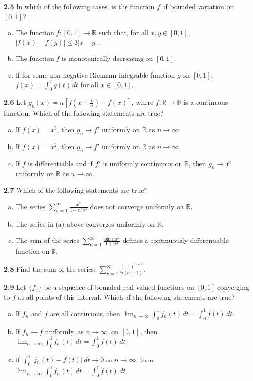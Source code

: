 \documentclass[11pt,a4paper]{article}
\newcommand{\R}{\mathbb{R}}
\newcommand{\qitem}[1]{\par\medskip\noindent\textbf{#1}\hspace{0.5em}}
\begin{document}
\qitem{2.5} In which of the following cases, is the function $f$ of bounded variation on $[0, 1]$?
\begin{enumerate}[a.]
  \item The function $f : [0, 1] \to \R$ such that, for all $x, y \in [0, 1]$, $|f(x) - f(y)| \le 3|x - y|$.
  \item The function $f$ is monotonically decreasing on $[0, 1]$.
  \item If for some non-negative Riemann integrable function $g$ on $[0, 1]$, $f(x) = \int_0^x g(t)\,dt$ for all $x \in [0, 1]$.
\end{enumerate}

\qitem{2.6} Let $g_n(x) = n\left[f\left(x + \frac{1}{n}\right) - f(x)\right]$, where $f : \R \to \R$ is a continuous function. Which of the following statements are true?
\begin{enumerate}[a.]
  \item If $f(x) = x^3$, then $g_n \to f'$ uniformly on $\R$ as $n \to \infty$.
  \item If $f(x) = x^2$, then $g_n \to f'$ uniformly on $\R$ as $n \to \infty$.
  \item If $f$ is differentiable and if $f'$ is uniformly continuous on $\R$, then $g_n \to f'$ uniformly on $\R$ as $n \to \infty$.
\end{enumerate}

\qitem{2.7} Which of the following statements are true?
\begin{enumerate}[a.]
  \item The series $\displaystyle\sum_{n=1}^{\infty} \frac{x^2}{1 + n^2 x^2}$ does not converge uniformly on $\R$.
  \item The series in (a) above converges uniformly on $\R$.
  \item The sum of the series $\displaystyle\sum_{n=1}^{\infty} \frac{\sin nx^2}{1 + n^3}$ defines a continuously differentiable function on $\R$.
\end{enumerate}

\qitem{2.8} Find the sum of the series: $\displaystyle\sum_{n=1}^{\infty} \frac{(-1)^{n+1}}{n(n+1)}$.

\qitem{2.9} Let $\{f_n\}$ be a sequence of bounded real valued functions on $[0, 1]$ converging to $f$ at all points of this interval. Which of the following statements are true?
\begin{enumerate}[a.]
  \item If $f_n$ and $f$ are all continuous, then $\lim_{n \to \infty} \int_0^1 f_n(t)\,dt = \int_0^1 f(t)\,dt$.
  \item If $f_n \to f$ uniformly, as $n \to \infty$, on $[0, 1]$, then $\lim_{n \to \infty} \int_0^1 f_n(t)\,dt = \int_0^1 f(t)\,dt$.
  \item If $\int_0^1 |f_n(t) - f(t)|\,dt \to 0$ as $n \to \infty$, then $\lim_{n \to \infty} \int_0^1 f_n(t)\,dt = \int_0^1 f(t)\,dt$.
\end{enumerate}
\end{document}

